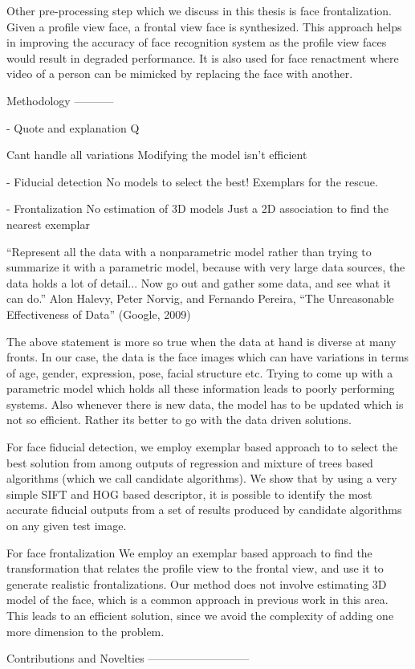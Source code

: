 Other pre-processing step which we discuss in this thesis is face frontalization. Given a profile
view face, a frontal view face is synthesized. This approach helps in improving the accuracy of 
face recognition system as the profile view faces would result in degraded performance. It is
also used for face renactment where video of a person can be mimicked by replacing the face with
another.

Methodology
-----------

- Quote and explanation
    Q
    
    Cant handle all variations
    Modifying the model isn't efficient
    
- Fiducial detection
    No models to select the best!
    Exemplars for the rescue.
    
- Frontalization
    No estimation of 3D models
    Just a 2D association to find the nearest exemplar


“Represent all the data with a nonparametric model rather than trying to
summarize it with a parametric model, because with very large data sources, the
data holds a lot of detail... Now go out and gather some data, and see what it can
do.”
Alon Halevy, Peter Norvig, and Fernando Pereira,
“The Unreasonable Effectiveness of Data” (Google, 2009)

The above statement is more so true when the data at hand is diverse at many fronts. In our case, 
the data is the face images which can have variations in terms of age, gender, expression, pose, 
facial structure etc. Trying to come up with a parametric model which holds all these information
leads to poorly performing systems. Also whenever there is new data, the model has to be updated
which is not so efficient. Rather its better to go with the data driven solutions.

For face fiducial detection, we employ exemplar based approach to to select the best solution 
from among outputs of regression and mixture of trees based algorithms (which we call candidate 
algorithms). We show that by using a very simple SIFT and HOG based descriptor, it is possible to 
identify the most accurate fiducial outputs from a set of results produced by candidate algorithms 
on any given test image. 

For face frontalization We employ an exemplar based approach to find the transformation that relates 
the profile view to the frontal view, and use it to generate realistic frontalizations. Our method 
does not involve estimating 3D model of the face, which is a common approach in previous work in 
this area. This leads to an efficient solution, since we avoid the complexity of adding one more 
dimension to the problem. 

Contributions and Novelties
---------------------------

